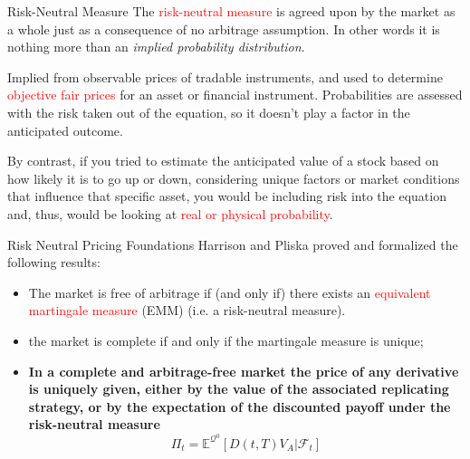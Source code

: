 \documentclass{beamer}
\begin{document}
\begin{frame}{Risk-Neutral Measure}
	The \textcolor{red}{risk-neutral measure} is agreed upon by the market as a whole just as a consequence of no arbitrage assumption.
	In other words it is nothing more than an \emph{implied probability distribution}.
	\pause
	
	Implied from observable prices of tradable instruments, and used to determine \textcolor{red}{objective fair prices} for an asset or financial instrument. Probabilities are assessed with the risk taken out of the equation, so it doesn’t play a factor in the anticipated outcome.
	\pause
	
	By contrast, if you tried to estimate the anticipated value of a stock based on how likely it is to go up or down, considering unique factors or market conditions that influence that specific asset, you would be including risk into the equation and, thus, would be looking at \textcolor{red}{real or physical probability}.
\end{frame}

\begin{frame}{Risk Neutral Pricing Foundations}
	Harrison and Pliska proved and formalized the following results:
	\begin{itemize}
		\item The market is free of arbitrage if (and only if) there exists an \textcolor{red}{equivalent martingale measure} (EMM) (i.e. a risk-neutral measure).
		\item the market is complete if and only if the martingale measure is unique;
		\item \textbf{In a complete and arbitrage-free market the price of any derivative is uniquely given, either by the value of the associated replicating strategy, or by the expectation of the discounted payoff under the risk-neutral measure}
		\begin{equation}
			\Pi_t = \mathbb{E}^{\mathcal{Q}^0}[D(t,T)V_A|\mathcal{F}_t]
			\label{eq:risk_neutral_pricing}
		\end{equation}
	\end{itemize}
\end{frame}
\end{document}
